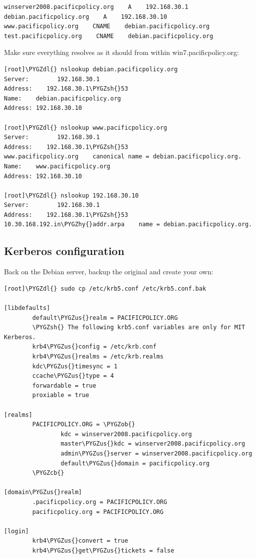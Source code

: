 \documentclass[letterpaper,10pt,english]{sphinxmanual}
\def\PYGZus{\char`\_}
\def\PYGZob{\char`\{}
\def\PYGZcb{\char`\}}
\def\PYGZsh{\char`\#}
\def\PYGZdl{\char`\$}
\def\PYGZhy{\char`\-}
\begin{document}
\begin{Verbatim}[commandchars=\\\{\}]
winserver2008.pacificpolicy.org    A    192.168.30.1
debian.pacificpolicy.org    A    192.168.30.10
www.pacificpolicy.org    CNAME    debian.pacificpolicy.org
test.pacificpolicy.org    CNAME    debian.pacificpolicy.org
\end{Verbatim}

Make sure everything resolves as it should from within
win7.pacificpolicy.org:

\begin{Verbatim}[commandchars=\\\{\}]
[root]\PYGZdl{} nslookup debian.pacificpolicy.org
Server:        192.168.30.1
Address:    192.168.30.1\PYGZsh{}53
Name:    debian.pacificpolicy.org
Address: 192.168.30.10

[root]\PYGZdl{} nslookup www.pacificpolicy.org
Server:        192.168.30.1
Address:    192.168.30.1\PYGZsh{}53
www.pacificpolicy.org    canonical name = debian.pacificpolicy.org.
Name:    www.pacificpolicy.org
Address: 192.168.30.10

[root]\PYGZdl{} nslookup 192.168.30.10
Server:        192.168.30.1
Address:    192.168.30.1\PYGZsh{}53
10.30.168.192.in\PYGZhy{}addr.arpa    name = debian.pacificpolicy.org.
\end{Verbatim}


\subsection{Kerberos configuration}
\label{administrator-guide:kerberos-configuration}
Back on the Debian server, backup the original and create your own:

\begin{Verbatim}[commandchars=\\\{\}]
[root]\PYGZdl{} sudo cp /etc/krb5.conf /etc/krb5.conf.bak

[libdefaults]
        default\PYGZus{}realm = PACIFICPOLICY.ORG
        \PYGZsh{} The following krb5.conf variables are only for MIT Kerberos.
        krb4\PYGZus{}config = /etc/krb.conf
        krb4\PYGZus{}realms = /etc/krb.realms
        kdc\PYGZus{}timesync = 1
        ccache\PYGZus{}type = 4
        forwardable = true
        proxiable = true

[realms]
        PACIFICPOLICY.ORG = \PYGZob{}
                kdc = winserver2008.pacificpolicy.org
                master\PYGZus{}kdc = winserver2008.pacificpolicy.org
                admin\PYGZus{}server = winserver2008.pacificpolicy.org
                default\PYGZus{}domain = pacificpolicy.org
        \PYGZcb{}

[domain\PYGZus{}realm]
        .pacificpolicy.org = PACIFICPOLICY.ORG
        pacificpolicy.org = PACIFICPOLICY.ORG

[login]
        krb4\PYGZus{}convert = true
        krb4\PYGZus{}get\PYGZus{}tickets = false
\end{Verbatim}
\end{document}
